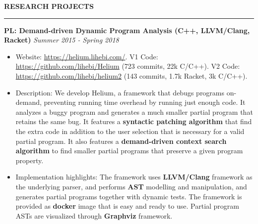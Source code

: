 \documentclass[10pt,letterpaper]{article}
\newenvironment{mysection}[1]{ %
  \medskip
  \MakeUppercase{\bf #1}
  \medskip
  \hrule
  \medskip
  \begin{list}{}{
      \setlength{\leftmargin}{1.5em}
    }
  \item[]
}{
  \end{list}
}
\begin{document}
\begin{mysection}{Research Projects}
  \textbf{PL: Demand-driven Dynamic Program Analysis (C++,
    LLVM/Clang, Racket)} \hfill \emph{Summer 2015 - Spring 2018}

  \begin{itemize}
  \item Website: \url{https://helium.lihebi.com/}. V1 Code:
    \url{https://github.com/lihebi/Helium} (723 commits, 22k
    C/C++). V2 Code: \url{https://github.com/lihebi/helium2} (143
    commits, 1.7k Racket, 3k C/C++).
  \item Description: We develop Helium, a framework that debugs
    programs on-demand, preventing running time overhead by running
    just enough code. It analyzes a buggy program and generates a much
    smaller partial program that retains the same bug.  It features a
    \textbf{syntactic patching algorithm} that find the extra code in
    addition to the user selection that is necessary for a valid
    partial program. It also features a \textbf{demand-driven context
      search algorithm} to find smaller partial programs that preserve
    a given program property.
  \item Implementation highlights: The framework uses
    \textbf{LLVM/Clang} framework as the underlying parser, and
    performs \textbf{AST} modelling and manipulation, and generates
    partial programs together with dynamic tests. The framework is
    provided as \textbf{docker} image that is easy and ready to
    use. Partial program ASTs are visualized through \textbf{Graphviz}
    framework.
  \end{itemize}


\end{mysection}

\end{document}
